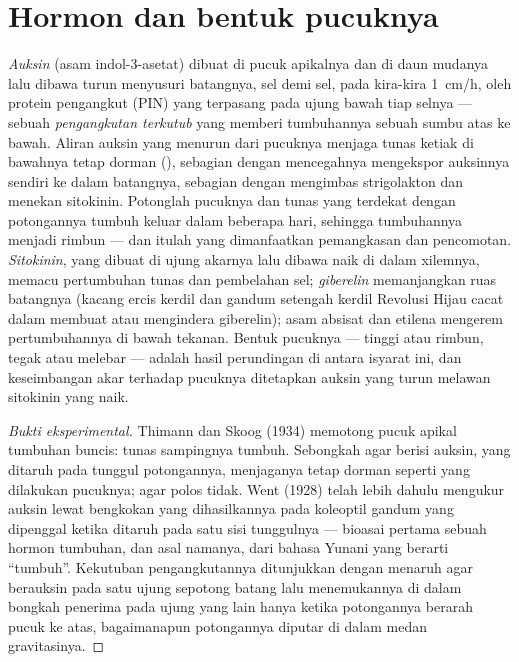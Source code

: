 \section{Hormon dan bentuk pucuknya}

\begin{proposition}\label{prop:b2:plant-meristems:apical}
%
\emph{Auksin} (asam indol-3-asetat) dibuat di pucuk apikalnya dan di
daun mudanya lalu dibawa turun menyusuri batangnya, sel demi sel, pada
kira-kira \qty{1}{cm/h}, oleh protein pengangkut (PIN) yang terpasang
pada ujung bawah tiap selnya --- sebuah \emph{pengangkutan terkutub}
yang memberi tumbuhannya sebuah sumbu atas ke bawah. Aliran auksin yang
menurun dari pucuknya menjaga tunas ketiak di bawahnya tetap dorman
(\emph{}), sebagian dengan mencegahnya mengekspor
auksinnya sendiri ke dalam batangnya, sebagian dengan mengimbas
strigolakton dan menekan sitokinin. Potonglah pucuknya dan tunas yang
terdekat dengan potongannya tumbuh keluar dalam beberapa hari, sehingga
tumbuhannya menjadi rimbun --- dan itulah yang dimanfaatkan pemangkasan
dan pencomotan. \emph{Sitokinin}, yang dibuat di ujung akarnya lalu
dibawa naik di dalam xilemnya, memacu pertumbuhan tunas dan pembelahan
sel; \emph{giberelin} memanjangkan ruas batangnya (kacang ercis kerdil
dan gandum setengah kerdil Revolusi Hijau cacat dalam membuat atau
mengindera giberelin); asam absisat dan etilena mengerem pertumbuhannya
di bawah tekanan. Bentuk pucuknya --- tinggi atau rimbun, tegak atau
melebar --- adalah hasil perundingan di antara isyarat ini, dan
keseimbangan akar terhadap pucuknya ditetapkan auksin yang turun
melawan sitokinin yang naik.
\end{proposition}
\begin{proof}[Bukti eksperimental]
Thimann dan Skoog (1934) memotong pucuk apikal tumbuhan buncis: tunas
sampingnya tumbuh. Sebongkah agar berisi auksin, yang ditaruh pada
tunggul potongannya, menjaganya tetap dorman seperti yang dilakukan
pucuknya; agar polos tidak. Went (1928) telah lebih dahulu mengukur
auksin lewat bengkokan yang dihasilkannya pada koleoptil gandum yang
dipenggal ketika ditaruh pada satu sisi tunggulnya --- bioasai pertama
sebuah hormon tumbuhan, dan asal namanya, dari bahasa Yunani yang
berarti ``tumbuh''. Kekutuban pengangkutannya ditunjukkan dengan
menaruh agar berauksin pada satu ujung sepotong batang lalu
menemukannya di dalam bongkah penerima pada ujung yang lain hanya
ketika potongannya berarah pucuk ke atas, bagaimanapun potongannya
diputar di dalam medan gravitasinya.
\end{proof}

